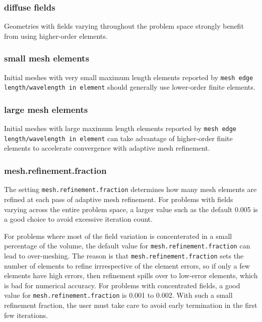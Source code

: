 \documentclass[titlepage]{article}
\renewcommand\_{\textunderscore\linebreak[1]}
\begin{document}
\subsubsection{diffuse fields}

Geometries with fields varying throughout the problem space strongly benefit from using higher-order elements.

\subsubsection{small mesh elements}

Initial meshes with very small maximum length elements reported by \texttt{mesh edge length/wavelength in element} should generally use lower-order finite elements.

\subsubsection{large mesh elements}

Initial meshes with large maximum length elements reported by \texttt{mesh edge length/wavelength in element} can take advantage of higher-order finite elements to accelerate convergence with adaptive mesh refinement.

\subsubsection{mesh.refinement.fraction}

The setting \texttt{mesh.refinement.fraction} determines how many mesh elements are refined at each pass of adaptive mesh refinement.  For problems with fields varying across the entire problem space, a larger value such as the default 0.005 is a good choice to avoid excessive iteration count.

For problems where most of the field variation is concenterated in a small percentage of the volume, the default value for \texttt{mesh.refinement.fraction} can lead to over-meshing.  The reason is that \newline\texttt{mesh.refinement.fraction} sets the number of elements to refine irrrespective of the element errors, so if only a few elements have high errors, then refinement spills over to low-error elements, which is bad for numerical accuracy.  For problems with concentrated fields, a good value for \texttt{mesh.refinement.fraction} is 0.001 to 0.002.  With such a small refinement fraction, the user must take care to avoid early termination in the first few iterations.
\end{document}
